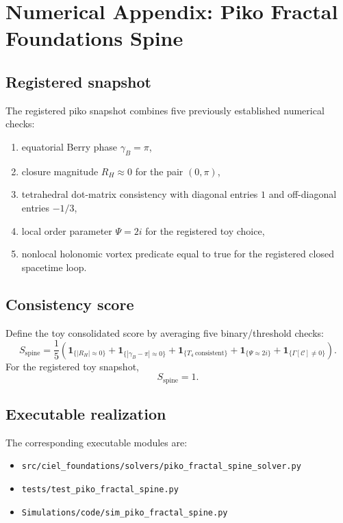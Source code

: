 \appendix
\section{Numerical Appendix: Piko Fractal Foundations Spine}
\label{app:piko-fractal-foundations-spine}

\subsection{Registered snapshot}
The registered piko snapshot combines five previously established numerical checks:
\begin{enumerate}
  \item equatorial Berry phase $\gamma_B = \pi$,
  \item closure magnitude $R_H \approx 0$ for the pair $(0,\pi)$,
  \item tetrahedral dot-matrix consistency with diagonal entries $1$ and off-diagonal entries $-1/3$,
  \item local order parameter $\Psi = 2i$ for the registered toy choice,
  \item nonlocal holonomic vortex predicate equal to true for the registered closed spacetime loop.
\end{enumerate}

\subsection{Consistency score}
Define the toy consolidated score by averaging five binary/threshold checks:
\begin{equation}
S_{\mathrm{spine}} = \frac{1}{5}\left(\mathbf 1_{\{|R_H|\approx 0\}} + \mathbf 1_{\{|\gamma_B-\pi|\approx 0\}} + \mathbf 1_{\{T_4\ \mathrm{consistent}\}} + \mathbf 1_{\{\Psi \approx 2i\}} + \mathbf 1_{\{\Gamma[\mathcal C]\neq 0\}}\right).
\end{equation}
For the registered toy snapshot,
\begin{equation}
S_{\mathrm{spine}} = 1.
\end{equation}

\subsection{Executable realization}
The corresponding executable modules are:
\begin{itemize}
  \item \texttt{src/ciel\_foundations/solvers/piko\_fractal\_spine\_solver.py}
  \item \texttt{tests/test\_piko\_fractal\_spine.py}
  \item \texttt{Simulations/code/sim\_piko\_fractal\_spine.py}
\end{itemize}
